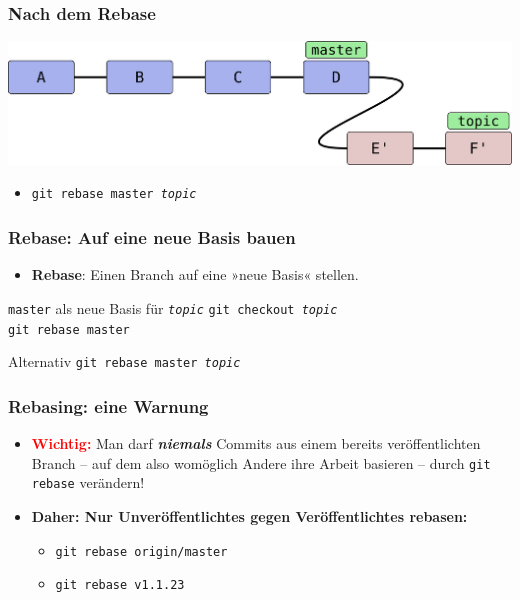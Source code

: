 \documentclass{beamer}
\begin{document}
\begin{frame}
	\frametitle{Nach dem Rebase}



\begin{center}
\includegraphics[scale=0.12]{bilder/rebase-nachher.pdf}
\end{center}

\begin{itemize}
	\item \texttt{git rebase master \emph{topic}}
\end{itemize}


 \end{frame}
\begin{frame}
 \frametitle{Rebase: Auf eine neue Basis bauen}



\begin{itemize}
	\item \textbf{Rebase}: Einen Branch auf eine »neue Basis« stellen.
\end{itemize}
\begin{block}{\texttt{master} als neue Basis für \texttt{\emph{topic}}}
\texttt{git checkout \emph{topic}} \\
\texttt{git rebase master}
\end{block}

\begin{block}{Alternativ}
\texttt{git rebase master \emph{topic}}
\end{block}


 \end{frame}
\begin{frame}
 \frametitle{Rebasing: eine Warnung}



\begin{itemize}
	\item \textcolor{red}{\textbf{Wichtig:}} Man darf \textbf{\emph{niemals}} Commits aus einem bereits veröffentlichten Branch -- auf dem also womöglich Andere ihre Arbeit basieren -- durch \texttt{git rebase} verändern!
	\item \textbf{Daher: Nur Unveröffentlichtes gegen Veröffentlichtes rebasen:}
\begin{itemize}
	\item \texttt{git rebase origin/master}
	\item \texttt{git rebase v1.1.23}
\end{itemize}
\end{itemize}


 \end{frame}
\end{document}
